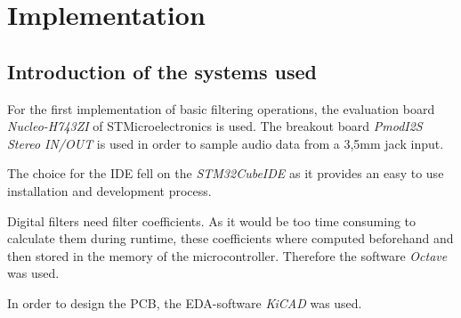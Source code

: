 \section{Implementation}

\subsection{Introduction of the systems used}

For the first implementation of basic filtering operations, the evaluation board \textit{Nucleo-H743ZI} of STMicroelectronics
is used. The breakout board \textit{PmodI2S Stereo IN/OUT} is used in order to sample audio data from a 3,5mm jack input.

The choice for the \ac{IDE} fell on the \textit{STM32CubeIDE} as it provides an easy to use installation and
development process.

Digital filters need filter coefficients. As it would be too time consuming to calculate them during runtime, these
coefficients where computed beforehand and then stored in the memory of the microcontroller. Therefore the
software \textit{Octave} was used.

In order to design the \ac{PCB}, the \ac{EDA}-software \textit{KiCAD} was used.
